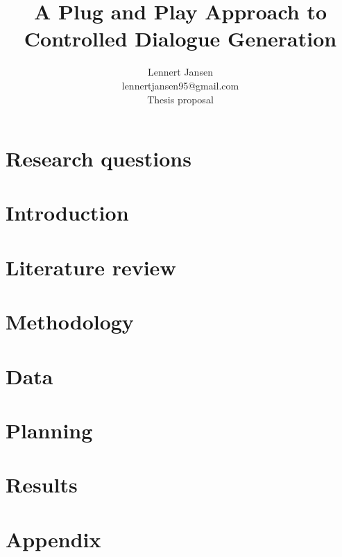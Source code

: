 \documentclass{article}
\title{A Plug and Play Approach to Controlled Dialogue Generation}
\author{%
  Lennert Jansen\\
  lennertjansen95@gmail.com \\
  Thesis proposal
}
\begin{document}
 
\maketitle

\tableofcontents

\newpage
\section{Research questions}


\newpage
\section{Introduction}


\section{Literature review}


\section{Methodology}



\section{Data}



\section{Planning}


\section{Results}




\newpage



\newpage


\appendix
\section{Appendix}

\end{document}
